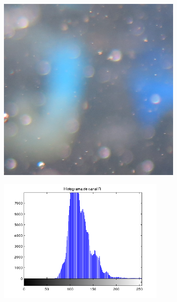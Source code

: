 \documentclass{article}
\begin{document}
\begin{figure}[H]
	\begin{subfigure}{0.5\textwidth}
	\centering
        \includegraphics[scale=0.4]{1923xx.png}
    \end{subfigure}\hfill
    \begin{subfigure}{0.5\textwidth}
        \includegraphics[width=0.9\textwidth]{histogramaR-1923.png}
    \end{subfigure}\hfill

\end{figure}
\end{document}
